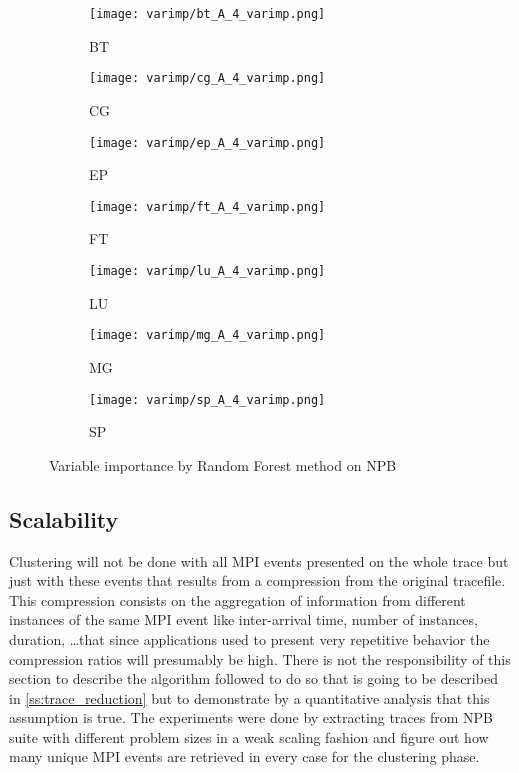 \begin{figure}
    \centering
    \begin{subfigure}[b]{0.3\textwidth}
        \texttt{[image: varimp/bt\_A\_4\_varimp.png]}
        \caption{BT}
        \label{fig:bt_varimp}
    \end{subfigure}
    \quad
    \begin{subfigure}[b]{0.3\textwidth}
        \texttt{[image: varimp/cg\_A\_4\_varimp.png]}
        \caption{CG}
        \label{fig:cg_varimp}
    \end{subfigure}
    \quad
    \begin{subfigure}[b]{0.3\textwidth}
        \texttt{[image: varimp/ep\_A\_4\_varimp.png]}
        \caption{EP}
        \label{fig:ep_varimp}
    \end{subfigure}
    
    \begin{subfigure}[b]{0.3\textwidth}
        \texttt{[image: varimp/ft\_A\_4\_varimp.png]}
        \caption{FT}
        \label{fig:ft_varimp}
    \end{subfigure}
    \quad
    \begin{subfigure}[b]{0.3\textwidth}
        \texttt{[image: varimp/lu\_A\_4\_varimp.png]}
        \caption{LU}
        \label{fig:lu_varimp}
    \end{subfigure}
    \quad
    \begin{subfigure}[b]{0.3\textwidth}
        \texttt{[image: varimp/mg\_A\_4\_varimp.png]}
        \caption{MG}
        \label{fig:mg_varimp}
    \end{subfigure}

    \begin{subfigure}[b]{0.3\textwidth}
        \texttt{[image: varimp/sp\_A\_4\_varimp.png]}
        \caption{SP}
        \label{fig:sp_varimp}
    \end{subfigure}
    \caption{Variable importance by Random Forest method on NPB}
\end{figure}

\subsection{Scalability}\label{ss:scalability}

Clustering will not be done with all MPI events presented on the whole trace but
just with these events that results from a compression from the original
tracefile. This compression consists on the aggregation of information from 
different instances of the same MPI event like inter-arrival time, number of
instances, duration, \ldots that since applications used to present very repetitive 
behavior the compression ratios will presumably be high. There is not the
responsibility of this section to describe the algorithm followed to do so that
is going to be described in \ref{ss:trace_reduction} but to demonstrate by a
quantitative analysis that this assumption is true. The experiments were done
by extracting traces from NPB suite with different problem sizes in a weak
scaling fashion and figure out how many unique MPI events are retrieved 
in every case for the clustering phase.  


